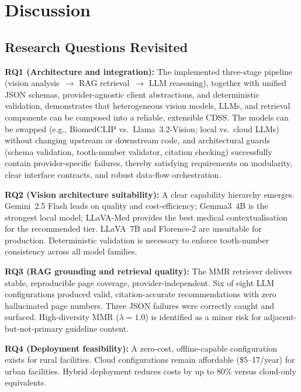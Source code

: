 \documentclass[12pt,a4paper]{report}
\begin{document}
\section{Discussion}
\label{sec:results_discussion}

\subsection{Research Questions Revisited}

\textbf{RQ1 (Architecture and integration):} The implemented three-stage pipeline (vision analysis~$\rightarrow$ RAG retrieval~$\rightarrow$ LLM reasoning), together with unified JSON schemas, provider-agnostic client abstractions, and deterministic validation, demonstrates that heterogeneous vision models, LLMs, and retrieval components can be composed into a reliable, extensible CDSS. The models can be swapped (e.g., BiomedCLIP vs.\ Llama~3.2-Vision; local vs.\ cloud LLMs) without changing upstream or downstream code, and architectural guards (schema validation, tooth-number validator, citation checking) successfully contain provider-specific failures, thereby satisfying requirements on modularity, clear interface contracts, and robust data-flow orchestration.

\textbf{RQ2 (Vision architecture suitability):} A clear capability hierarchy
emerges. Gemini~2.5 Flash leads on quality and cost-efficiency; Gemma3~4B is
the strongest local model; LLaVA-Med provides the best medical contextualisation
for the recommended tier. LLaVA~7B and Florence-2 are unsuitable for production.
Deterministic validation is necessary to enforce tooth-number consistency across
all model families.

\textbf{RQ3 (RAG grounding and retrieval quality):} The MMR retriever delivers
stable, reproducible page coverage, provider-independent. Six of eight LLM
configurations produced valid, citation-accurate recommendations with zero
hallucinated page numbers. Three JSON failures were correctly caught and surfaced.
High-diversity MMR ($\lambda{=}1.0$) is identified as a minor risk for
adjacent-but-not-primary guideline content.

\textbf{RQ4 (Deployment feasibility):} A zero-cost, offline-capable
configuration exists for rural facilities. Cloud configurations remain affordable
(\$5--17/year) for urban facilities. Hybrid deployment reduces costs by up to
80\% versus cloud-only equivalents.
\end{document}
